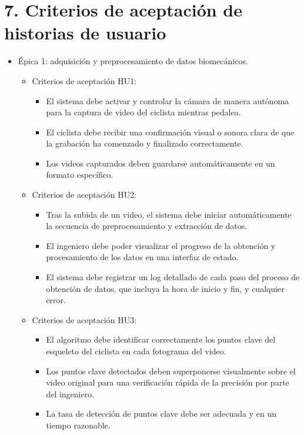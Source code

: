 \documentclass[
11pt, %
]{charter}
\begin{document}
\section{7. Criterios de aceptación de historias de usuario}
\label{sec:criteriosAceptacion}

\begin{itemize}
  \item Épica 1: adquisición y preprocesamiento de datos biomecánicos.
    \begin{itemize}
      \item Criterios de aceptación HU1:
        \begin{itemize}
          \item El sistema debe activar y controlar la cámara de manera autónoma para la captura de video del ciclista mientras pedalea.
          \item El ciclista debe recibir una confirmación visual o sonora clara de que la grabación ha comenzado y finalizado correctamente.
          \item Los videos capturados deben guardarse automáticamente en un formato específico.
        \end{itemize}
      \item Criterios de aceptación HU2:
        \begin{itemize}
          \item Tras la subida de un video, el sistema debe iniciar automáticamente la secuencia de preprocesamiento y extracción de datos.
          \item El ingeniero debe poder visualizar el progreso de la obtención y procesamiento de los datos en una interfaz de estado.
          \item El sistema debe registrar un log detallado de cada paso del proceso de obtención de datos, que incluya la hora de inicio y fin, y cualquier error.
        \end{itemize}
      \item Criterios de aceptación HU3:
        \begin{itemize}
          \item El algoritmo debe identificar correctamente los puntos clave del esqueleto del ciclista en cada fotograma del video.
          \item Los puntos clave detectados deben superponerse visualmente sobre el video original para una verificación rápida de la precisión por parte del ingeniero.
          \item La tasa de detección de puntos clave debe ser adecuada y en un tiempo razonable.

\end{itemize}
\end{itemize}
\end{itemize}
\end{document}
